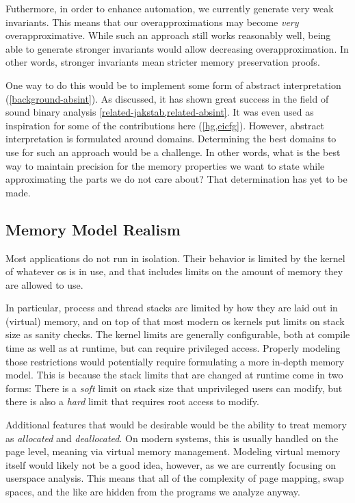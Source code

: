 Futhermore, in order to enhance automation, we currently generate very weak invariants.
This means that our overapproximations may become \emph{very} overapproximative.
While such an approach still works reasonably well, being able to generate stronger invariants would allow decreasing overapproximation.
In other words, stronger invariants mean stricter memory preservation proofs.

One way to do this would be to implement some form of abstract interpretation (\cref{background-absint}).
As discussed, it has shown great success in the field of sound binary analysis \cref{related-jakstab,related-absint}.
It was even used as inspiration for some of the contributions here (\cref{hg,eicfg}).
However, abstract interpretation is formulated around domains.
Determining the best domains to use for such an approach would be a challenge.
In other words, what is the best way to maintain precision for the memory properties we want to state while approximating the parts we do not care about?
That determination has yet to be made.

\subsection{Memory Model Realism}
Most applications do not run in isolation.
Their behavior is limited by the kernel of whatever \ac{os} is in use, and that includes limits on the amount of memory they are allowed to use.

In particular, process and thread stacks are limited by how they are laid out in (virtual) memory, and on top of that most modern \ac{os} kernels put limits on stack size as sanity checks.
The kernel limits are generally configurable, both at compile time as well as at runtime, but can require privileged access.
Properly modeling those restrictions would potentially require formulating a more in-depth memory model.
This is because the stack limits that are changed at runtime come in two forms:
There is a \emph{soft} limit on stack size that unprivileged users can modify, but there is also a \emph{hard} limit that requires root access to modify.

Additional features that would be desirable would be the ability to treat memory as \emph{allocated} and \emph{deallocated}.
On modern systems, this is usually handled on the page level, meaning via virtual memory management.
Modeling virtual memory itself would likely not be a good idea, however, as we are currently focusing on userspace analysis.
This means that all of the complexity of page mapping, swap spaces, and the like are hidden from the programs we analyze anyway.


